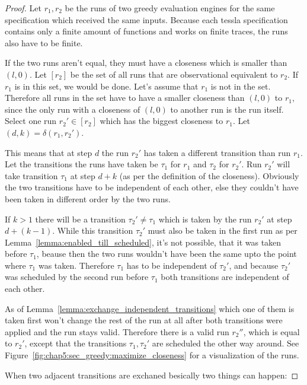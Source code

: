 \begin{proof}\label{proof:equiv_greedy_engines}
  Let \(r_1, r_2\) be the runs of two greedy evaluation engines for the same specification which received the same inputs.
  Because each \gls{tessla} specification contains only a finite amount of functions and works on finite traces, the runs also have to be finite.

  If the two runs aren't equal, they must have a closeness which is smaller than \((l, 0)\).
  Let \([r_2]\) be the set of all runs that are observational equivalent to \(r_2\).
  If \(r_1\) is in this set, we would be done.
  Let's assume that \(r_1\) is not in the set.
  Therefore all runs in the set have to have a smaller closeness than \((l,0)\) to \(r_1\), since the only run with a closeness of \((l,0)\) to another run is the run itself.
  Select one run \(r_2' \in [r_2]\) which has the biggest closeness to \(r_1\).
  Let \((d,k) = \delta(r_1, r_2')\).

  This means that at step \(d\) the run \(r_2'\) has taken a different transition than run \(r_1\).
  Let the transitions the runs have taken be \(\tau_1\) for \(r_1\) and \(\tau_2\) for \(r_2'\).
  Run \(r_2'\) will take transition \(\tau_1\) at step \(d+k\) (as per the definition of the closeness).
  Obviously the two transitions have to be independent of each other, else they couldn't have been taken in different order by the two runs.

  If \(k > 1\) there will be a transition \(\tau_2' \neq \tau_1\) which is taken by the run \(r_2'\) at step \(d+(k-1)\).
  While this transition \(\tau_2'\) must also be taken in the first run as per Lemma~\ref{lemma:enabled_till_scheduled}, it's not possible, that it was taken before \(\tau_1\), beause then the two runs wouldn't have been the same upto the point where \(\tau_1\) was taken.
  Therefore \(\tau_1\) has to be independent of \(\tau_2'\), and because \(\tau_2'\) was scheduled by the second run before \(\tau_1\) both transitions are independent of each other.

  As of Lemma~\ref{lemma:exchange_independent_transitions} which one of them is taken first won't change the rest of the run at all after both transitions were applied and the run stays valid.
  Therefore there is a valid run \(r_2''\), which is equal to \(r_2'\), except that the transitions \(\tau_1, \tau_2'\) are scheduled the other way around.
  See Figure~\ref{fig:chap5:sec_greedy:maximize_closeness} for a visualization of the runs.

  When two adjacent transitions are exchaned besically two things can happen:


\end{proof}
